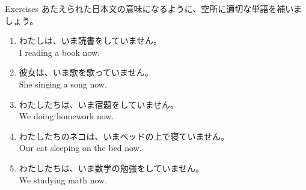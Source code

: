 \documentclass[aspectratio=169,xcolor={dvipsnames,table}]{beamer}
\newcommand{\myaudio}[1]{\href{#1}{\faVolumeUp}}
\begin{document}
\begin{frame}[plain]{Exercises}
あたえられた日本文の意味になるように、空所に適切な単語を補いましょう。

\begin{enumerate}
 \item わたしは、いま読書をしていません。\\
I  reading a book now.
 \item 彼女は、いま歌を歌っていません。\\
She  singing a song now.
 \item わたしたちは、いま宿題をしていません。\\
We  doing homework now.
 \item わたしたちのネコは、いまベッドの上で寝ていません。\\
Our cat  sleeping on the bed now.
 \item わたしたちは、いま数学の勉強をしていません。\\
We  studying math now.
\end{enumerate} 


\mbox{}\hfill\myaudio{./audio/022_is_ing_negative_02.mp3}

\end{frame}
\end{document}
